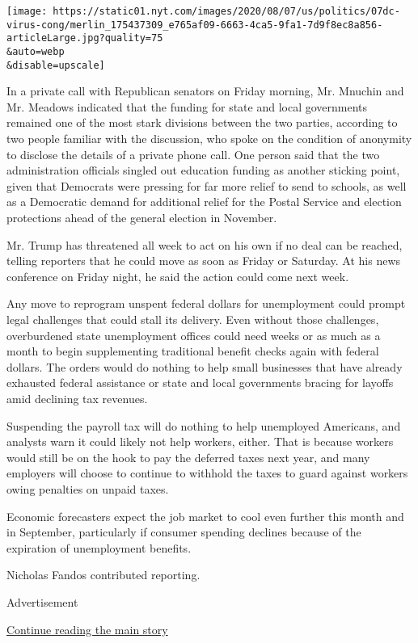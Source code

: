 \texttt{[image: https://static01.nyt.com/images/2020/08/07/us/politics/07dc-virus-cong/merlin\_175437309\_e765af09-6663-4ca5-9fa1-7d9f8ec8a856-articleLarge.jpg?quality=75\\\&auto=webp\\\&disable=upscale]}

In a private call with Republican senators on Friday morning, Mr.
Mnuchin and Mr. Meadows indicated that the funding for state and local
governments remained one of the most stark divisions between the two
parties, according to two people familiar with the discussion, who spoke
on the condition of anonymity to disclose the details of a private phone
call. One person said that the two administration officials singled out
education funding as another sticking point, given that Democrats were
pressing for far more relief to send to schools, as well as a Democratic
demand for additional relief for the Postal Service and election
protections ahead of the general election in November.

Mr. Trump has threatened all week to act on his own if no deal can be
reached, telling reporters that he could move as soon as Friday or
Saturday. At his news conference on Friday night, he said the action
could come next week.

Any move to reprogram unspent federal dollars for unemployment could
prompt legal challenges that could stall its delivery. Even without
those challenges, overburdened state unemployment offices could need
weeks or as much as a month to begin supplementing traditional benefit
checks again with federal dollars. The orders would do nothing to help
small businesses that have already exhausted federal assistance or state
and local governments bracing for layoffs amid declining tax revenues.

Suspending the payroll tax will do nothing to help unemployed Americans,
and analysts warn it could likely not help workers, either. That is
because workers would still be on the hook to pay the deferred taxes
next year, and many employers will choose to continue to withhold the
taxes to guard against workers owing penalties on unpaid taxes.

Economic forecasters expect the job market to cool even further this
month and in September, particularly if consumer spending declines
because of the expiration of unemployment benefits.

Nicholas Fandos contributed reporting.

Advertisement

\protect\hyperlink{after-bottom}{Continue reading the main story}

